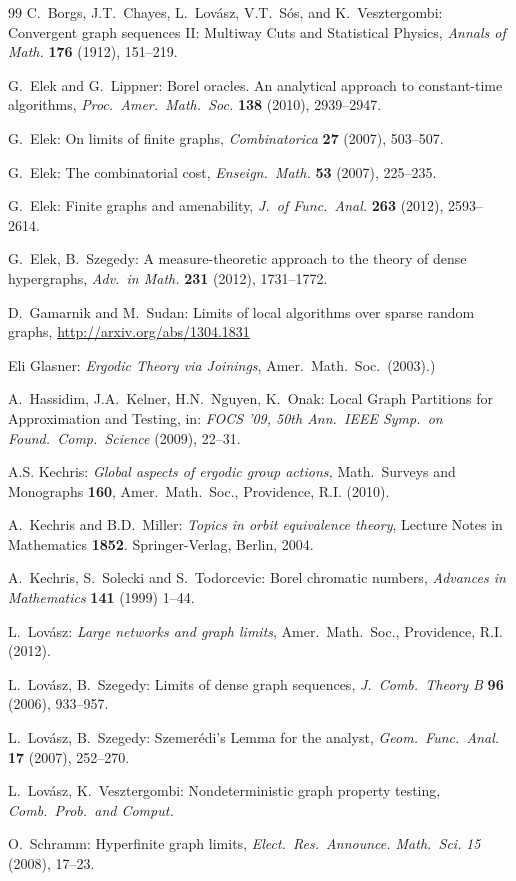\documentclass{article}
\begin{document}
\begin{thebibliography}{99}
 C.~Borgs, J.T.~Chayes, L.~Lov\'asz, V.T.~S\'os, and
    K.~Vesztergombi: Convergent graph sequences II: Multiway Cuts and
    Statistical Physics, {\it Annals of Math.} {\bf176}
    (1912), 151--219.

 G.~Elek and G.~Lippner: Borel oracles. An analytical
    approach to constant-time algorithms, \emph{Proc.\ Amer.\ Math.\
    Soc.} {\bf 138} (2010), 2939--2947.

 G.~Elek: On limits of finite graphs,
    \emph{Combinatorica} {\bf 27} (2007), 503--507.

 G.~Elek: The combinatorial cost, \emph{Enseign.\
    Math.} {\bf53} (2007), 225--235.

 G.~Elek: Finite graphs and amenability, {\it J.~of
    Func.\ Anal.} {\bf263} (2012), 2593--2614.

 G.~Elek, B.~Szegedy: A measure-theoretic approach to
    the theory of dense hypergraphs, {\it Adv.\ in Math.} {\bf231} (2012),
    1731--1772.

 D.~Gamarnik and M.~Sudan: Limits of local algorithms
    over sparse random graphs, \url{http://arxiv.org/abs/1304.1831}

\bibitem{Glas} Eli Glasner: {\it Ergodic Theory via Joinings}, Amer.\
    Math.\ Soc.\ (2003).)

\bibitem{HKNO} A.~Hassidim, J.A.~Kelner, H.N.~Nguyen, K.~Onak: Local
    Graph Partitions for Approximation and Testing, in: \emph{FOCS
    '09, 50th Ann.\ IEEE Symp.\ on Found.\ Comp.\ Science} (2009),
    22--31.

\bibitem{Kech} A.S. Kechris: {\it Global aspects of ergodic group
    actions,} Math.\ Surveys and Monographs {\bf160}, Amer.\ Math.\ Soc.,
    Providence, R.I. (2010).

\bibitem{KM} A.~Kechris and B.D.~Miller: \emph{Topics in orbit
    equivalence theory}, Lecture Notes in Mathematics {\bf 1852}.
    Springer-Verlag, Berlin, 2004.

\bibitem{KST} A.~Kechris, S.~Solecki and S.~Todorcevic: Borel
    chromatic numbers, \emph{Advances in Mathematics} {\bf 141}
    (1999) 1--44.

\bibitem{LL} L.~Lov\'asz: \emph{Large networks and graph limits},
    Amer.\ Math.\ Soc., Providence, R.I. (2012).

\bibitem{LSz} L.~Lov\'asz, B.~Szegedy: Limits of dense graph
    sequences, \emph{J.~Comb.\ Theory B} {\bf 96}  (2006),  933--957.

\bibitem{LSz2} L.~Lov\'asz, B.~Szegedy: Szemer\'edi's Lemma for the
    analyst, \emph{Geom.\ Func.\ Anal.} {\bf 17} (2007), 252--270.

\bibitem{LV} L.~Lov\'asz, K.~Vesztergombi: Nondeterministic graph
    property testing, \emph{Comb.\ Prob.\ and Comput.}

\bibitem{Schramm} O.~Schramm: Hyperfinite graph limits, \emph{Elect.\
    Res.\ Announce. Math.\ Sci.} \emph{15} (2008), 17--23.
\end{thebibliography}
\end{document}
